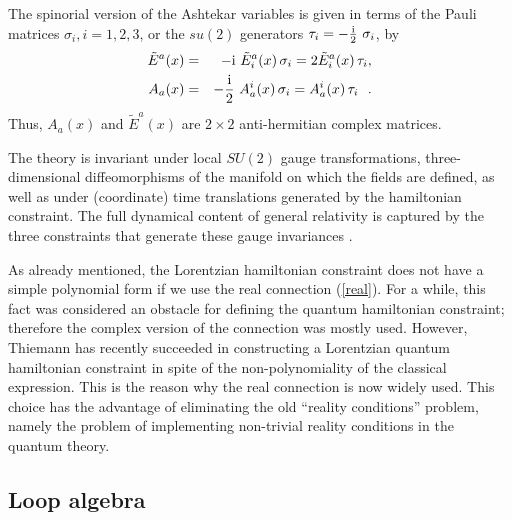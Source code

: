 The spinorial version of the Ashtekar variables is given in terms 
of the Pauli matrices $\sigma_i, i=1,2,3$, or the $su(2)$ 
generators ${\tau_i} = - \frac{{\rm i}}{2} \ {\sigma_i}$, by 
%
\begin{eqnarray}
\tilde{E}^{a}(x) 
        &=& - {\rm i}\ \tilde{E}^a_i(x) \, {\sigma_i}
         =  2 \tilde{E}^a_i(x) \, {\tau_i},  \\
A_{a}(x)&=& - \frac{{\rm i}}{{2}}\ {A}_a^i(x)\, {\sigma_i}
         = {A}_a^i(x)\, {\tau_i}\ \ .
\end{eqnarray}
%
Thus, $A_a(x)$ and $\tilde{E}^a(x)$ are $2\times 2$ 
anti-hermitian complex matrices. 

The theory is invariant under local $SU(2)$ gauge 
transformations, three-dimensional diffeomorphisms of the 
manifold on which the fields are defined, as well as under 
(coordinate) time translations generated by the hamiltonian 
constraint.  The full dynamical content of general relativity is 
captured by the three constraints that generate these gauge 
invariances \cite{Sen,AshtekarBook}.  

As already mentioned, the Lorentzian hamiltonian constraint does 
not have a simple polynomial form if we use the real connection 
(\ref{real}).  For a while, this fact was considered an obstacle 
for defining the quantum hamiltonian constraint; therefore the 
complex version of the connection was mostly used.  However, 
Thiemann has recently succeeded in constructing a Lorentzian 
quantum hamiltonian constraint 
\cite{Thiemann96,Thiemann96b,Thiemann96c} in spite of the 
non-polynomiality of the classical expression.  This is the 
reason why the real connection is now widely used.  This choice 
has the advantage of eliminating the old ``reality conditions'' 
problem, namely the problem of implementing non-trivial reality 
conditions in the quantum theory.

\subsection{Loop algebra} \label{LoopAlgebra}

